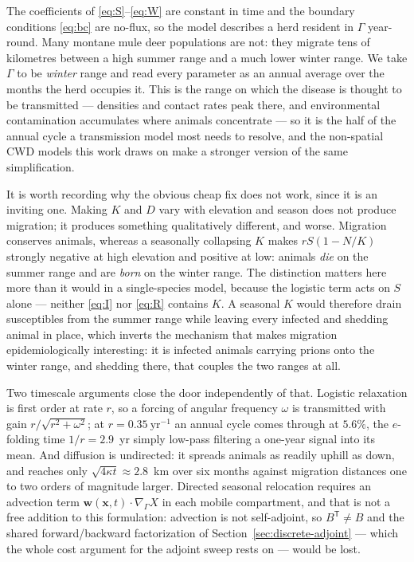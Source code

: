 \documentclass[11pt]{article}
\newcommand{\Grad}{\nabla_\Gamma}
\begin{document}
The coefficients of \eqref{eq:S}--\eqref{eq:W} are constant in time and the boundary conditions \eqref{eq:bc} are no-flux, so the model describes a herd resident in $\Gamma$ year-round. Many montane mule deer populations are not: they migrate tens of kilometres between a high summer range and a much lower winter range. We take $\Gamma$ to be \emph{winter} range and read every parameter as an annual average over the months the herd occupies it. This is the range on which the disease is thought to be transmitted --- densities and contact rates peak there, and environmental contamination accumulates where animals concentrate --- so it is the half of the annual cycle a transmission model most needs to resolve, and the non-spatial CWD models this work draws on \citep{Almberg2011,Miller2006,Wasserberg2009} make a stronger version of the same simplification.

It is worth recording why the obvious cheap fix does not work, since it is an inviting one. Making $K$ and $D$ vary with elevation and season does not produce migration; it produces something qualitatively different, and worse. Migration conserves animals, whereas a seasonally collapsing $K$ makes $rS(1-N/K)$ strongly negative at high elevation and positive at low: animals \emph{die} on the summer range and are \emph{born} on the winter range. The distinction matters here more than it would in a single-species model, because the logistic term acts on $S$ alone --- neither \eqref{eq:I} nor \eqref{eq:R} contains $K$. A seasonal $K$ would therefore drain susceptibles from the summer range while leaving every infected and shedding animal in place, which inverts the mechanism that makes migration epidemiologically interesting: it is infected animals carrying prions onto the winter range, and shedding there, that couples the two ranges at all.

Two timescale arguments close the door independently of that. Logistic relaxation is first order at rate $r$, so a forcing of angular frequency $\omega$ is transmitted with gain $r/\sqrt{r^2+\omega^2}$; at $r = 0.35\ \mathrm{yr}^{-1}$ an annual cycle comes through at $5.6\%$, the $e$-folding time $1/r = 2.9$~yr simply low-pass filtering a one-year signal into its mean. And diffusion is undirected: it spreads animals as readily uphill as down, and reaches only $\sqrt{4\kappa t}\approx 2.8$~km over six months against migration distances one to two orders of magnitude larger. Directed seasonal relocation requires an advection term $\mathbf{w}(\mathbf{x},t)\cdot\Grad X$ in each mobile compartment, and that is not a free addition to this formulation: advection is not self-adjoint, so $B^{\mathsf T}\neq B$ and the shared forward/backward factorization of Section~\ref{sec:discrete-adjoint} --- which the whole cost argument for the adjoint sweep rests on --- would be lost.
\end{document}
